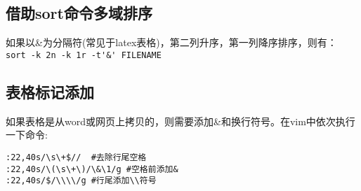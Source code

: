 \subsection{借助sort命令多域排序}
如果以\&为分隔符(常见于latex表格)，第二列升序，第一列降序排序，则有：
\verb+sort -k 2n -k 1r -t'&' FILENAME+

\subsection{表格标记添加}
如果表格是从word或网页上拷贝的，则需要添加\&和换行符号。在vim中依次执行一下命令:
\begin{verbatim}
:22,40s/\s\+$//  #去除行尾空格
:22,40s/\(\s\+\)/\&\1/g #空格前添加&
:22,40s/$/\\\\/g #行尾添加\\符号
\end{verbatim}


